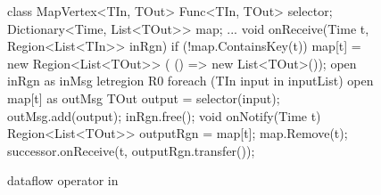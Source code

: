 \begin{figure}[t!]
\begin{numcodejava}
class MapVertex<TIn, TOut> {
  Func<TIn, TOut> selector;
  Dictionary<Time, List<TOut>> map;
  ...
  void onReceive(Time t, Region<List<TIn>> inRgn) {
    if (!map.ContainsKey(t))
       map[t] = new Region<List<TOut>> (
                  () => new List<TOut>());
    open inRgn as inMsg {
      letregion R0 {
        foreach (TIn input in inputList) {
          open map[t] as outMsg {
            TOut output = selector(input);
            outMsg.add(output);
          }
        }
      }
    }
    inRgn.free();
  }
  void onNotify(Time t) {
     Region<List<TOut>> outputRgn = map[t];
     map.Remove(t);
     successor.onReceive(t, outputRgn.transfer()); 
  }
}
\end{numcodejava}
\caption{ dataflow operator in \name}
\label{fig:motivating-eg-in-broom}
\end{figure}
